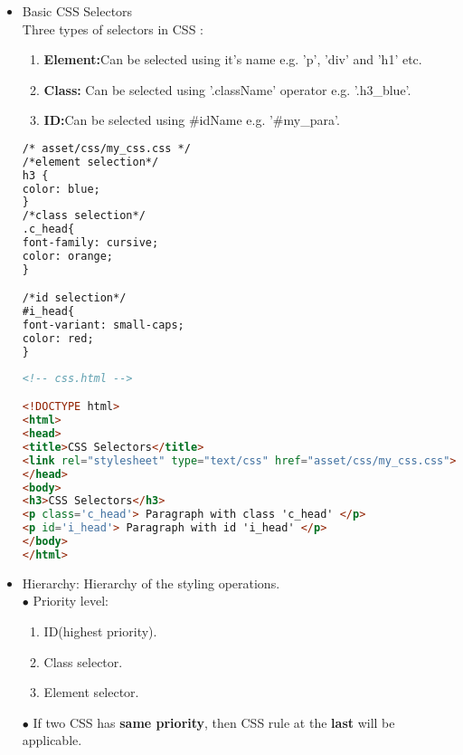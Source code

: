 \begin{itemize}
	\item Basic CSS Selectors \\
	Three types of  selectors in CSS :  
	\begin{enumerate}
		\item \textbf{Element:}Can be selected using it's name e.g. 'p', 'div' and 'h1' etc.
		\item \textbf{Class:} Can be selected using '.className' operator e.g. '.h3\_blue'.
		\item \textbf{ID:}Can be selected using \#idName e.g. '\#my\_para'.
	\end{enumerate}
\begin{lstlisting}[language=html,style=base,numbers=none]
/* asset/css/my_css.css */
/*element selection*/
h3 {
color: blue;
}
/*class selection*/
.c_head{
font-family: cursive;
color: orange;
}

/*id selection*/
#i_head{
font-variant: small-caps;
color: red;
}
\end{lstlisting}
\begin{lstlisting}[language=html]
<!-- css.html -->

<!DOCTYPE html>
<html>
<head>
<title>CSS Selectors</title>
<link rel="stylesheet" type="text/css" href="asset/css/my_css.css">
</head>
<body>
<h3>CSS Selectors</h3>
<p class='c_head'> Paragraph with class 'c_head' </p>
<p id='i_head'> Paragraph with id 'i_head' </p>
</body>
</html>
\end{lstlisting}
	\item Hierarchy:
	Hierarchy of the styling operations.\\
	$\bullet$ Priority level: 
	\begin{enumerate}
		\item ID(highest priority).
		\item Class selector.
		\item Element selector.
	\end{enumerate}
    $\bullet$ If two CSS has \textbf{same priority}, then CSS rule at the \textbf{last} will be applicable.
	\newpage
	

\end{itemize}
